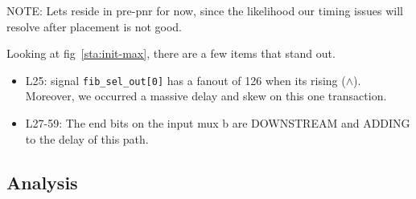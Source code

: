 \documentclass[a4paper]{report}
\begin{document}
			NOTE: Lets reside in pre-pnr for now, since the likelihood our
			timing issues will resolve after placement is not good. 
			
			\newpage
			

			Looking at fig~\ref{sta:init-max}, there are a few items that stand out.
			\begin{itemize}
				\item L25: signal \verb|fib_sel_out[0]| has a fanout of 126 when its rising ($\wedge$).
					Moreover, we occurred a massive delay and skew on this one transaction. 
				\item L27-59: The end bits on the input mux b are DOWNSTREAM 
					and ADDING to the delay of this path. 
			\end{itemize}

			\subsection{Analysis}
\end{document}
